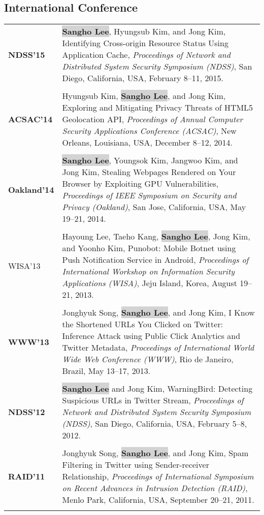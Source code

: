 \documentclass[letterpaper]{article}
\def\name{Sangho Lee}
\newcommand{\myname}{\colorbox{lightgray}{\textbf{\name}}\xspace}
\begin{document}
\subsection*{International Conference}
\begin{longtable}{@{}p{0.8in}p{5.4in}@{}}
  \textbf{NDSS'15} &  \myname, Hyungsub Kim, and Jong Kim, Identifying Cross-origin Resource Status Using Application Cache, 
  {\em Proceedings of Network and Distributed System Security Symposium ({NDSS})}, San Diego, California, USA, February 8--11, 2015. \\\\
  \textbf{ACSAC'14} & Hyungsub Kim, \myname, and Jong Kim, Exploring and Mitigating Privacy Threats of HTML5 Geolocation API, 
  \emph{Proceedings of Annual Computer Security Applications Conference (ACSAC)}, New Orleans, Louisiana, USA, December 8--12, 2014.\\\\
  \textbf{Oakland'14} & \myname, Youngsok Kim, Jangwoo Kim, and Jong Kim, Stealing Webpages Rendered on Your Browser by Exploiting GPU Vulnerabilities, \emph{ Proceedings of IEEE Symposium on Security and Privacy ({Oakland})}, San Jose, California, USA, May 19--21, 2014.\\\\
  {WISA'13} & Hayoung Lee, Taeho Kang, \myname, Jong Kim, and Yoonho Kim, Punobot: Mobile Botnet using Push Notification Service in Android, {\it Proceedings of International Workshop on Information Security Applications (WISA)}, Jeju Island, Korea, August 19--21, 2013.\\\\
  \textbf{WWW'13} & Jonghyuk Song, \myname, and Jong Kim, I Know the Shortened URLs You Clicked on Twitter: Inference Attack using Public Click Analytics and Twitter Metadata, \emph{Proceedings of International World Wide Web Conference ({WWW})}, Rio de Janeiro, Brazil, May 13--17, 2013.\\\\
  \textbf{NDSS'12} & \myname and Jong Kim, WarningBird: Detecting Suspicious URLs in Twitter Stream, \emph{Proceedings of Network and Distributed System Security Symposium ({NDSS})}, San Diego, California, USA, February 5--8, 2012.\\\\
  \textbf{RAID'11} & Jonghyuk Song, \myname, and Jong Kim, Spam Filtering in Twitter using Sender-receiver Relationship, \emph{Proceedings of International Symposium on Recent Advances in Intrusion Detection ({RAID})}, Menlo Park, California, USA, September 20--21, 2011.\\\\

\end{longtable}
\end{document}

